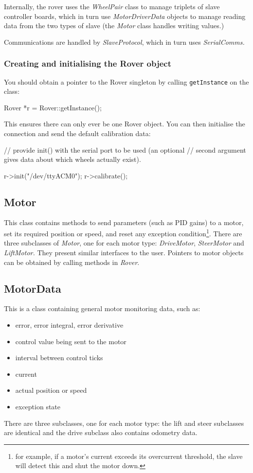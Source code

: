 Internally, the rover uses the \emph{WheelPair} class to manage triplets
of slave controller boards, which in turn use \emph{MotorDriverData} objects
to manage reading data from the two types of slave (the \emph{Motor} class
handles writing values.) 

Communications are handled by \emph{SlaveProtocol}, which in turn uses
\emph{SerialComms.} 

\subsubsection{Creating and initialising the Rover object}
You should obtain a pointer to the Rover singleton
by calling \texttt{getInstance} on the class:
\begin{v}
    Rover *r = Rover::getInstance();
\end{v}
This ensures there can only ever be one Rover object. You can then 
initialise the connection and send the default calibration data:
\begin{v}
    // provide init() with the serial port to be used (an optional
    // second argument gives data about which wheels actually exist).
    
    r->init("/dev/ttyACM0");
    r->calibrate();
\end{v}


\subsection{Motor}
This class contains methods to send parameters (such as PID gains) to a motor,
set its required position or speed, and reset any exception condition\footnote{for example, if
a motor's current exceeds its overcurrent threshold, the slave will detect this
and shut the motor down.}. There are three subclasses of \emph{Motor}, one
for each motor type: \emph{DriveMotor}, \emph{SteerMotor} and \emph{LiftMotor.} They present similar interfaces to the user.
Pointers to motor objects can be obtained by calling methods in \emph{Rover}.

\subsection{MotorData}
This is a class containing general motor monitoring data, such as:
\begin{itemize}
\item error, error integral, error derivative
\item control value being sent to the motor
\item interval between control ticks
\item current
\item actual position or speed
\item exception state
\end{itemize}
There are three subclasses, one for each motor type: the lift and steer
subclasses are identical and the drive subclass also contains odometry data.

